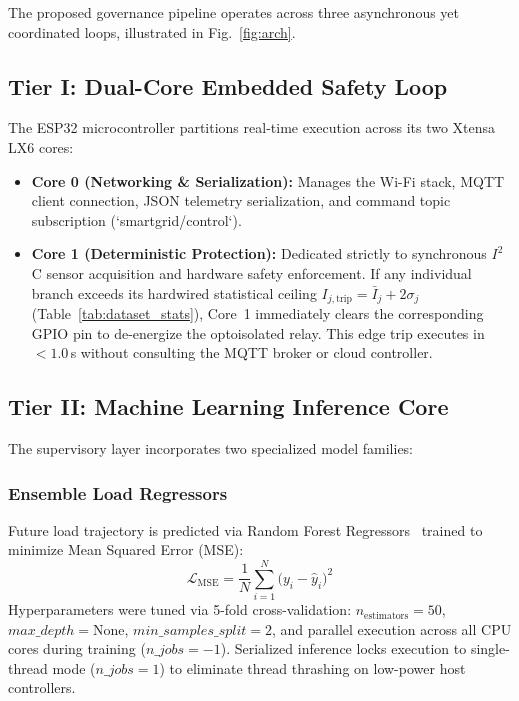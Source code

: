 \documentclass[journal,10pt,twocolumn]{IEEEtran}
\begin{document}
The proposed governance pipeline operates across three asynchronous yet coordinated loops, illustrated in Fig.~\ref{fig:arch}.

\subsection{Tier I: Dual-Core Embedded Safety Loop}
The ESP32 microcontroller partitions real-time execution across its two Xtensa LX6 cores:
\begin{itemize}
    \item \textbf{Core 0 (Networking \& Serialization):} Manages the Wi-Fi stack, MQTT client connection, JSON telemetry serialization, and command topic subscription (`smartgrid/control`).
    \item \textbf{Core 1 (Deterministic Protection):} Dedicated strictly to synchronous $I^2$C sensor acquisition and hardware safety enforcement. If any individual branch exceeds its hardwired statistical ceiling $I_{j, \text{trip}} = \bar{I}_j + 2\sigma_j$ (Table~\ref{tab:dataset_stats}), Core~1 immediately clears the corresponding GPIO pin to de-energize the optoisolated relay. This edge trip executes in $<1.0$\,s without consulting the MQTT broker or cloud controller.
\end{itemize}

\subsection{Tier II: Machine Learning Inference Core}
The supervisory layer incorporates two specialized model families:

\subsubsection{Ensemble Load Regressors}
Future load trajectory is predicted via Random Forest Regressors~\cite{breiman2001random} trained to minimize Mean Squared Error (MSE):
\begin{equation}
\mathcal{L}_{\text{MSE}} = \frac{1}{N} \sum_{i=1}^N \big(y_i - \hat{y}_i\big)^2
\label{eq:mse_loss}
\end{equation}
Hyperparameters were tuned via 5-fold cross-validation: $n_{\text{estimators}} = 50$, $max\_depth = \text{None}$, $min\_samples\_split = 2$, and parallel execution across all CPU cores during training ($n\_jobs = -1$). Serialized inference locks execution to single-thread mode ($n\_jobs = 1$) to eliminate thread thrashing on low-power host controllers.
\end{document}
